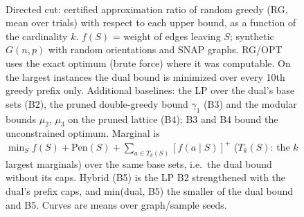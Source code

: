 \begin{figure}[t]
\centering
\setlength{\rgplotwidth}{0.245\textwidth}
\\[1pt]
\hfill
\hfill
\hfill

\caption{Directed cut: certified approximation ratio of random greedy (RG, mean over trials) with respect to each upper bound, as a function of the cardinality $k$. $f(S)$ = weight of edges leaving $S$; synthetic $G(n,p)$ with random orientations and SNAP graphs. RG/OPT uses the exact optimum (brute force) where it was computable. On the largest instances the dual bound is minimized over every 10th greedy prefix only. Additional baselines: the LP over the dual's base sets (B2), the pruned double-greedy bound $\gamma_1$ (B3) and the modular bounds $\mu_2$, $\mu_3$ on the pruned lattice (B4); B3 and B4 bound the unconstrained optimum. Marginal is $\min_S f(S)+\mathrm{Pen}(S)+\sum_{a\in T_k(S)}[f(a\mid S)]^+$ ($T_k(S)$: the $k$ largest marginals) over the same base sets, i.e.\ the dual bound without its caps. Hybrid (B5) is the LP B2 strengthened with the dual's prefix caps, and min(dual, B5) the smaller of the dual bound and B5. Curves are means over graph/sample seeds.}
\label{fig:rg-directed_cut-wide-hybrid}
\end{figure}
